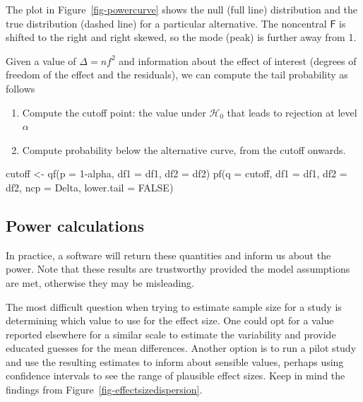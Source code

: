 \documentclass[
  11pt,
  letterpaper,
]{scrbook}
\newenvironment{Shaded}{\begin{snugshade}}{\end{snugshade}}
\newcommand{\AttributeTok}[1]{\textcolor[rgb]{0.40,0.45,0.13}{#1}}
\newcommand{\ConstantTok}[1]{\textcolor[rgb]{0.56,0.35,0.01}{#1}}
\newcommand{\DecValTok}[1]{\textcolor[rgb]{0.68,0.00,0.00}{#1}}
\newcommand{\FunctionTok}[1]{\textcolor[rgb]{0.28,0.35,0.67}{#1}}
\newcommand{\NormalTok}[1]{\textcolor[rgb]{0.00,0.23,0.31}{#1}}
\newcommand{\OtherTok}[1]{\textcolor[rgb]{0.00,0.23,0.31}{#1}}
\newcommand{\SpecialCharTok}[1]{\textcolor[rgb]{0.37,0.37,0.37}{#1}}
\providecommand{\tightlist}{%
  \setlength{\itemsep}{0pt}\setlength{\parskip}{0pt}}\usepackage{longtable,booktabs,array}
\theoremstyle{definition}
\theoremstyle{definition}
\theoremstyle{remark}
\begin{document}
The plot in Figure~\ref{fig-powercurve} shows the null (full line)
distribution and the true distribution (dashed line) for a particular
alternative. The noncentral \(\mathsf{F}\) is shifted to the right and
right skewed, so the mode (peak) is further away from 1.

Given a value of \(\Delta=nf^2\) and information about the effect of
interest (degrees of freedom of the effect and the residuals), we can
compute the tail probability as follows

\begin{enumerate}
\def\labelenumi{\arabic{enumi}.}
\tightlist
\item
  Compute the cutoff point: the value under \(\mathscr{H}_0\) that leads
  to rejection at level \(\alpha\)
\item
  Compute probability below the alternative curve, from the cutoff
  onwards.
\end{enumerate}

\begin{Shaded}
\begin{Highlighting}[]
\NormalTok{cutoff }\OtherTok{\textless{}{-}} \FunctionTok{qf}\NormalTok{(}\AttributeTok{p =} \DecValTok{1}\SpecialCharTok{{-}}\NormalTok{alpha, }\AttributeTok{df1 =}\NormalTok{ df1, }\AttributeTok{df2 =}\NormalTok{ df2)}
\FunctionTok{pf}\NormalTok{(}\AttributeTok{q =}\NormalTok{ cutoff,  }\AttributeTok{df1 =}\NormalTok{ df1, }\AttributeTok{df2 =}\NormalTok{ df2, }
    \AttributeTok{ncp =}\NormalTok{ Delta, }\AttributeTok{lower.tail =} \ConstantTok{FALSE}\NormalTok{)}
\end{Highlighting}
\end{Shaded}

\subsection{Power calculations}\label{power-calculations}

In practice, a software will return these quantities and inform us about
the power. Note that these results are trustworthy provided the model
assumptions are met, otherwise they may be misleading.

The most difficult question when trying to estimate sample size for a
study is determining which value to use for the effect size. One could
opt for a value reported elsewhere for a similar scale to estimate the
variability and provide educated guesses for the mean differences.
Another option is to run a pilot study and use the resulting estimates
to inform about sensible values, perhaps using confidence intervals to
see the range of plausible effect sizes. Keep in mind the findings from
Figure~\ref{fig-effectsizedispersion}.
\end{document}
